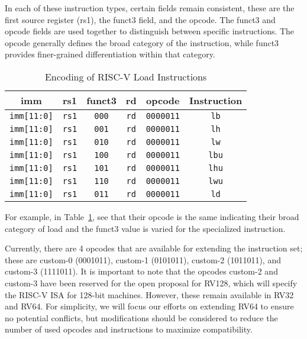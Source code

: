 \documentclass[conference,compsoc]{IEEEtran}
\begin{document}
In each of these instruction types, certain fields remain consistent, these are the first source register (rs1), the funct3 field, and the opcode. 
The funct3 and opcode fields are used together to distinguish between specific instructions. 
The opcode generally defines the broad category of the instruction, while funct3 provides finer-grained differentiation within that category.

\begin{table}[H]
  \centering
  \caption{Encoding of RISC-V Load Instructions}
  \small
  {
  \begin{tabular}{|c|c|c|c|c|c|}
    \hline
    \textbf{imm} & \textbf{rs1} & \textbf{funct3} & \textbf{rd} & \textbf{opcode} & \textbf{Instruction} \\
    \hline
    \texttt{imm[11:0]} & \texttt{rs1} & \texttt{000} & \texttt{rd} & \texttt{0000011} & \texttt{lb} \\
    \texttt{imm[11:0]} & \texttt{rs1} & \texttt{001} & \texttt{rd} & \texttt{0000011} & \texttt{lh} \\
    \texttt{imm[11:0]} & \texttt{rs1} & \texttt{010} & \texttt{rd} & \texttt{0000011} & \texttt{lw} \\
    \texttt{imm[11:0]} & \texttt{rs1} & \texttt{100} & \texttt{rd} & \texttt{0000011} & \texttt{lbu} \\
    \texttt{imm[11:0]} & \texttt{rs1} & \texttt{101} & \texttt{rd} & \texttt{0000011} & \texttt{lhu} \\
    \texttt{imm[11:0]} & \texttt{rs1} & \texttt{110} & \texttt{rd} & \texttt{0000011} & \texttt{lwu} \\
    \texttt{imm[11:0]} & \texttt{rs1} & \texttt{011} & \texttt{rd} & \texttt{0000011} & \texttt{ld} \\
    \hline
  \end{tabular}
  }
  \label{tab:load-instructions}
\end{table}

For example, in Table~\ref{tab:load-instructions}, see that their opcode is the same indicating their broad category of load and the funct3 value is varied for the specialized instruction.

Currently, there are 4 opcodes that are available for extending the instruction set; these are custom-0 (0001011), custom-1 (0101011), custom-2 (1011011), and custom-3 (1111011).
It is important to note that the opcodes custom-2 and custom-3 have been reserved for the open proposal for RV128, which will specify the RISC-V ISA for 128-bit machines. 
However, these remain available in RV32 and RV64. 
For simplicity, we will focus our efforts on extending RV64 to ensure no potential conflicts, but modifications should be considered to reduce the number of used opcodes and instructions to maximize compatibility.
\end{document}
